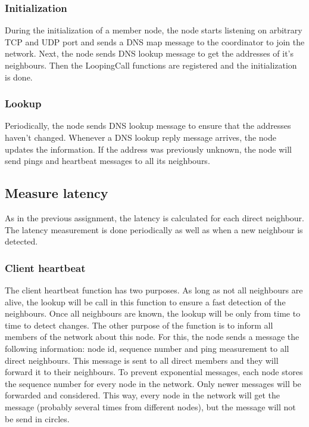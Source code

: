 \documentclass[paper=a4, fontsize=11pt]{scrartcl} %
\numberwithin{equation}{section} %
\numberwithin{figure}{section} %
\numberwithin{table}{section} %
\begin{document}
\subsubsection{Initialization}

During the initialization of a member node, the node starts listening on arbitrary TCP and UDP port and sends a DNS map message to the coordinator to join the network. Next, the node sends DNS lookup message to get the addresses of it's neighbours. Then the LoopingCall functions are registered and the initialization is done. 

\subsubsection{Lookup}
Periodically, the node sends DNS lookup message to ensure that the addresses haven't changed. Whenever a DNS lookup reply message arrives, the node updates the information. If the address was previously unknown, the node will send pings and heartbeat messages to all its neighbours.

\subsection{Measure latency}

As in the previous assignment, the latency is calculated for each direct neighbour. The latency measurement is done periodically as well as when a new neighbour is detected.

\subsubsection{Client heartbeat}
The client heartbeat function has two purposes. As long as not all neighbours are alive, the lookup will be call in this function to ensure a fast detection of the neighbours. Once all neighbours are known, the lookup will be only from time to time to detect changes. The other purpose of the function is to inform all members of the network about this node. For this, the node sends a message the following information: node id, sequence number and ping measurement to all direct neighbours. This message is sent to all direct members and they will forward it to their neighbours. To prevent exponential messages, each node stores the sequence number for every node in the network. Only newer messages will be forwarded and considered. This way, every node in the network will get the message (probably several times from different nodes), but the message will not be send in circles.
\end{document}
